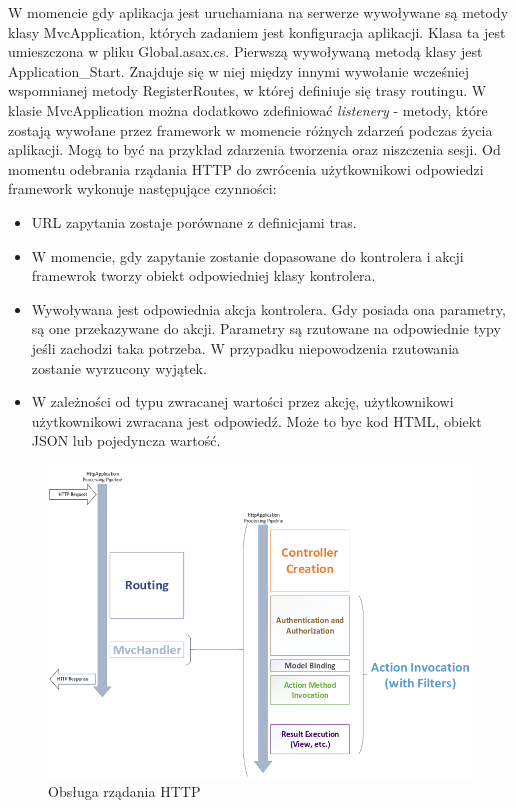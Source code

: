 W momencie gdy aplikacja jest uruchamiana na serwerze wywoływane są metody klasy MvcApplication, których zadaniem jest konfiguracja aplikacji. Klasa ta jest umieszczona w pliku Global.asax.cs. Pierwszą wywoływaną metodą klasy jest Application\_Start. Znajduje się w niej między innymi wywołanie wcześniej wspomnianej metody RegisterRoutes, w której definiuje się trasy routingu. W klasie MvcApplication można dodatkowo zdefiniować \textit{listenery} - metody, które zostają wywołane przez framework w momencie różnych zdarzeń podczas życia aplikacji. Mogą to być na przykład zdarzenia tworzenia oraz niszczenia sesji.
Od momentu odebrania rządania HTTP do zwrócenia użytkownikowi odpowiedzi framework wykonuje następujące czynności:
\begin{itemize}
\item URL zapytania zostaje porównane z definicjami tras.
\item W momencie, gdy zapytanie zostanie dopasowane do kontrolera i akcji framewrok tworzy obiekt odpowiedniej klasy kontrolera. 
\item Wywoływana jest odpowiednia akcja kontrolera. Gdy posiada ona parametry, są one przekazywane do akcji. Parametry są rzutowane na odpowiednie typy jeśli zachodzi taka potrzeba. W przypadku niepowodzenia rzutowania zostanie wyrzucony wyjątek.
\item W zależności od typu zwracanej wartości przez akcję, użytkownikowi użytkownikowi zwracana jest odpowiedź. Może to byc kod HTML, obiekt JSON lub pojedyncza wartość.
\end{itemize}

\begin{figure}[b]
	\includegraphics[width=140mm]{./img/mvc-diagram.png}
	\caption{Obsługa rządania HTTP}
	\label{fig:mvc-diagram}
\end{figure}




